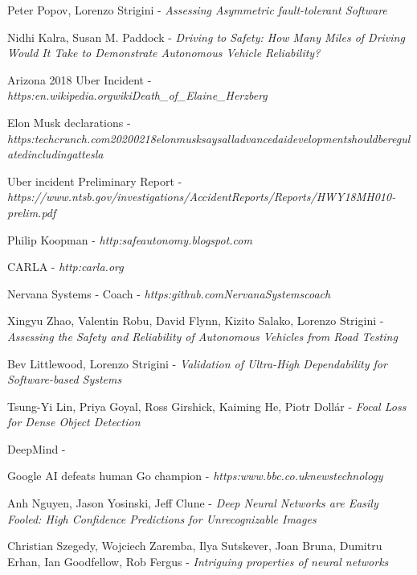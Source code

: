 \begin{thebibliography}{9}

Peter Popov, Lorenzo Strigini - \textit{Assessing Asymmetric fault-tolerant Software}

Nidhi Kalra, Susan M. Paddock - \textit{Driving to Safety: How Many Miles of Driving Would It Take to Demonstrate Autonomous Vehicle Reliability?}

Arizona 2018 Uber Incident - 
\textit{https:\/\/en.wikipedia.org\/wiki\/Death\_of\_Elaine\_Herzberg}

Elon Musk declarations - \textit{https:\/\/techcrunch.com\/2020\/02\/18\/elon\-musk\-says\-all\-advanced\-ai\-development\-should\-be\-regulated\-including\-at\-tesla}

Uber incident Preliminary Report - \textit{https://www.ntsb.gov/investigations/AccidentReports/Reports/HWY18MH010-prelim.pdf}

Philip Koopman - \textit{http:\/\/safeautonomy.blogspot.com\/}

CARLA - \textit{http:\/\/carla.org\/}

Nervana Systems - Coach - \textit{https:\/\/github.com\/NervanaSystems\/coach}

Xingyu Zhao, Valentin Robu, David Flynn, Kizito Salako, Lorenzo Strigini - \textit{Assessing the Safety and Reliability of Autonomous Vehicles from Road Testing}

Bev Littlewood, Lorenzo Strigini - \textit{Validation of Ultra-High Dependability for Software-based Systems}

Tsung-Yi Lin, Priya Goyal, Ross Girshick, Kaiming He, Piotr Dollár - \textit{Focal Loss for Dense Object Detection}

DeepMind - 

Google AI defeats human Go champion - \textit{https:\/\/www.bbc.co.uk\/news\/technology}

Anh Nguyen, Jason Yosinski, Jeff Clune - \textit{Deep Neural Networks are Easily Fooled: High Confidence Predictions for Unrecognizable Images}

Christian Szegedy, Wojciech Zaremba, Ilya Sutskever, Joan Bruna, Dumitru Erhan, Ian Goodfellow, Rob Fergus - \textit{Intriguing properties of neural networks}

\end{thebibliography}